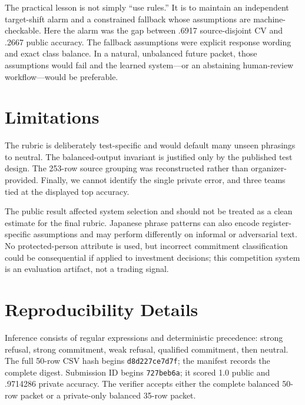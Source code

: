 \documentclass[11pt]{article}
\begin{document}
The practical lesson is not simply ``use rules.''  It is to maintain an
independent target-shift alarm and a constrained fallback whose assumptions are
machine-checkable.  Here the alarm was the gap between .6917 source-disjoint CV
and .2667 public accuracy.  The fallback assumptions were explicit response
wording and exact class balance.  In a natural, unbalanced future packet, those
assumptions would fail and the learned system---or an abstaining human-review
workflow---would be preferable.

\section*{Limitations}
The rubric is deliberately test-specific and would default many unseen phrasings to neutral. The balanced-output invariant is justified only by the published test design. The 253-row source grouping was reconstructed rather than organizer-provided. Finally, we cannot identify the single private error, and three teams tied at the displayed top accuracy.

The public result affected system selection and should not be treated as a
clean estimate for the final rubric.  Japanese phrase patterns can also encode
register-specific assumptions and may perform differently on informal or
adversarial text.  No protected-person attribute is used, but incorrect
commitment classification could be consequential if applied to investment
decisions; this competition system is an evaluation artifact, not a trading
signal.

\clearpage


\appendix
\section{Reproducibility Details}
Inference consists of regular expressions and deterministic precedence: strong refusal, strong commitment, weak refusal, qualified commitment, then neutral. The full 50-row CSV hash begins \texttt{d8d227ce7d7f}; the manifest records the complete digest. Submission ID begins \texttt{727beb6a}; it scored 1.0 public and .9714286 private accuracy. The verifier accepts either the complete balanced 50-row packet or a private-only balanced 35-row packet.
\end{document}
